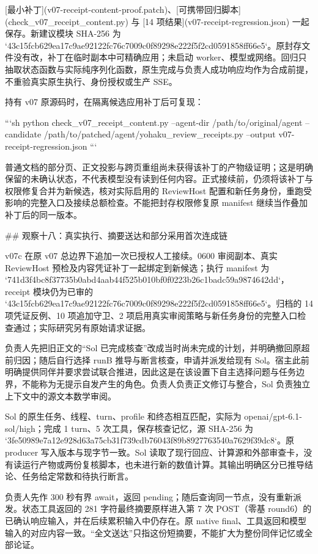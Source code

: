 [最小补丁](v07-receipt-content-proof.patch)、[可携带回归脚本](check_v07_receipt_content.py) 与 [14 项结果](v07-receipt-regression.json) 一起保存。新建议模块 SHA-256 为 `43c15fcb629ea17c9ae92122fc76c7009c0f89298e222f5f2cd0591858ff66e5`。原封存文件没有改，补丁在临时副本中可精确应用；未启动 worker、模型或网络。回归只抽取状态函数与实际纯序列化函数，原生完成与负责人成功响应均作为合成前提，不重验真实原生执行、身份授权或生产 SSE。

持有 v07 原源码时，在隔离候选应用补丁后可复现：

```sh
python check_v07_receipt_content.py --agent-dir /path/to/original/agent --candidate /path/to/patched/agent/yohaku_review_receipts.py --output v07-receipt-regression.json
```

普通文档的部分页、正文投影与跨页重组尚未获得该补丁的产物级证明；这是明确保留的未确认状态，不代表模型没有读到任何内容。正式接续前，仍须将该补丁与权限修复合并为新候选，核对实际启用的 ReviewHost 配置和新任务身份，重跑受影响的完整入口及接续总额检查。不能把封存权限修复原 manifest 继续当作叠加补丁后的同一版本。

## 观察十八：真实执行、摘要送达和部分采用首次连成链

v07c 在原 v07 总边界下追加一次已授权人工接续。0600 审阅副本、真实 ReviewHost 预检及内容凭证补丁一起绑定到新候选；执行 manifest 为 `741d3f4bc8f37735b0abd4aab44f525b010bf0f0223b26c1badc59a9874642dd`，receipt 模块仍为已审的 `43c15fcb629ea17c9ae92122fc76c7009c0f89298e222f5f2cd0591858ff66e5`。归档的 14 项凭证反例、10 项追加守卫、2 项启用真实审阅策略与新任务身份的完整入口检查通过；实际研究另有原始请求证据。

负责人先把旧正文的“Sol 已完成核查”改成当时尚未完成的计划，并明确撤回原超前归因；随后自行选择 runB 推导与断言核查，申请并派发给现有 Sol。宿主此前明确提供同伴并要求尝试联合推进，因此这是在该设置下自主选择问题与任务边界，不能称为无提示自发产生的角色。负责人负责正文修订与整合，Sol 负责独立上下文中的源文本数学审阅。

Sol 的原生任务、线程、turn、profile 和终态相互匹配，实际为 openai/gpt-6.1-sol/high；完成 1 turn、5 次工具，保存核查记忆，源 SHA-256 为 `3fe50989e7a12e928d63a75cb31f739cdb76043f89b8927763540a7629f39dc8`。原 producer 写入版本与现字节一致。Sol 读取了现行回应、计算源和外部审查卡，没有读运行产物或两份复核脚本，也未进行新的数值计算。其输出明确区分已推导结论、任务给定常数和待执行断言。

负责人先作 300 秒有界 await，返回 pending；随后查询同一节点，没有重新派发。状态工具返回的 281 字符最终摘要原样进入第 7 次 POST（零基 round6）的已确认响应输入，并在后续累积输入中仍存在。原 native final、工具返回和模型输入的对应内容一致。“全文送达”只指这份短摘要，不能扩大为整份同伴记忆或全部论证。

